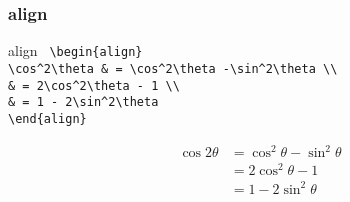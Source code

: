 \subsubsection{align}
\begin{itembox}[c]{align}
  \texttt{
    \hspace{-0.5\zw}\textbackslash begin\{align\}\\
    \hspace{4\zw}\textbackslash cos\textasciicircum2\textbackslash theta \& = \textbackslash cos\textasciicircum2\textbackslash theta -\textbackslash sin\textasciicircum2\textbackslash theta \textbackslash \textbackslash\\
    \hspace{4\zw}\& = 2\textbackslash cos\textasciicircum2\textbackslash theta - 1          \textbackslash \textbackslash\\
    \hspace{4\zw}\& = 1 - 2\textbackslash sin\textasciicircum2\textbackslash theta\\
    \textbackslash end\{align\}\\
  }
\end{itembox}
\begin{align}
  \cos 2\theta & = \cos^2\theta -\sin^2\theta \\
               & = 2\cos^2\theta - 1          \\
               & = 1 - 2\sin^2\theta
\end{align}